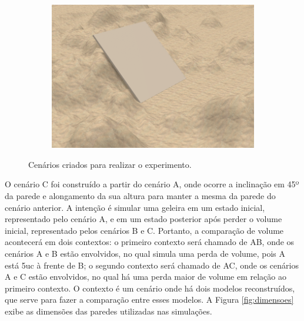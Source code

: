 \begin{figure}[H]
\begin{subfigure}[t]{0.328\textwidth}
        \includegraphics[width=\textwidth]{dados/figuras/scene4.png}
        \caption{}
        \label{fig:scene3}
    \end{subfigure}
    \caption{Cenários criados para realizar o experimento.}
    \label{fig:scenaries}
\end{figure}

O cenário C foi construído a partir do cenário A, onde ocorre a inclinação em 45º da parede e alongamento da sua altura para manter a mesma da parede do cenário anterior.
A intenção é simular uma geleira em um estado inicial, representado pelo cenário A, e em um estado posterior após perder o volume inicial, representado pelos cenários B e C.
Portanto, a comparação de volume acontecerá em dois contextos: o primeiro contexto será chamado de AB, onde os cenários A e B estão envolvidos, no qual simula uma perda de volume, pois A está 5uc à frente de B; o segundo contexto será chamado de AC, onde os cenários A e C estão envolvidos, no qual há uma perda maior de volume em relação ao primeiro contexto.
O contexto é um cenário onde há dois modelos reconstruídos, que serve para fazer a comparação entre esses modelos.
A Figura \ref{fig:dimensoes} exibe as dimensões das paredes utilizadas nas simulações.

